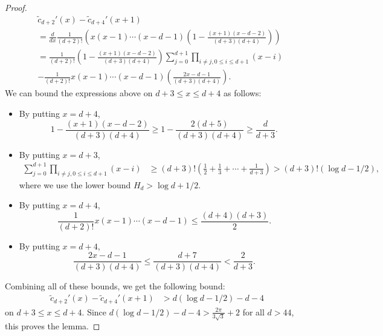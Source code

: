\documentclass[12pt]{amsart}
\theoremstyle{definition}
\begin{document}
\begin{proof}
    \begin{align*}
        &\tilde{c}_{d+2}'(x) - \tilde{c}_{d+4}'(x+1) \\
        &= \frac{d}{dx}\frac{1}{(d+2)!}\left( x(x-1)\cdots (x-d-1) \left(1-\frac{(x+1)(x-d-2)}{(d+3)(d+4)}\right) \right) \\
        &= \frac{1}{(d+2)!}\left(1-\frac{(x+1)(x-d-2)}{(d+3)(d+4)}\right)
        \sum_{j=0}^{d+1}\prod_{i\neq j,0\leq i\leq d+1}^{}(x-i) \\
        &-\frac{1}{(d+2)!}x(x-1)\cdots (x-d-1)\left(\frac{2x-d-1}{(d+3)(d+4)}\right).
    \end{align*}
    We can bound the expressions above on $d+3\leq x\leq d+4$ as follows:
    \begin{itemize}
        \item By putting $x=d+4$,
        $$ 1-\frac{(x+1)(x-d-2)}{(d+3)(d+4)} \geq 1 - \frac{2(d+5)}{(d+3)(d+4)}
        \geq\frac{d}{d+3}. $$
        \item By putting $x=d+3$,
        \begin{align*}
            \sum_{j=0}^{d+1}\prod_{i\neq j,0\leq i\leq d+1}^{}(x-i) 
            &\geq (d+3)!\left(\frac{1}{2}+\frac{1}{3}+\cdots + \frac{1}{d+3}\right)
            > (d+3)! \left(\log d -1/2 \right),
        \end{align*}
        where we use the lower bound $H_d > \log d + 1/2$.
        \item By putting $x=d+4$,
        $$ \frac{1}{(d+2)!}x(x-1)\cdots (x-d-1) 
        \leq \frac{(d+4)(d+3)}{2}. $$
        \item By putting $x=d+4$,
        $$ \frac{2x-d-1}{(d+3)(d+4)} \leq \frac{d+7}{(d+3)(d+4)} < \frac{2}{d+3}. $$
        
    \end{itemize}
    Combining all of these bounds, we get the following bound:
    \begin{align*}
        \tilde{c}_{d+2}'(x) - \tilde{c}_{d+4}'(x+1) 
        &> d\left(\log d-1/2\right) - d-4
    \end{align*}
    on $d+3\leq x\leq d+4$. Since $d\left(\log d-1/2\right) - d-4 > \frac{2\pi}{3\sqrt{3}}+2$ for all $d> 44$, this proves the lemma.
 \end{proof}
 
\end{document}
